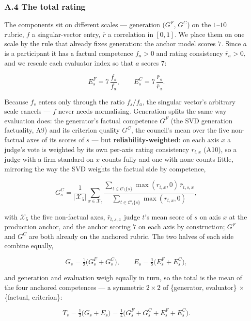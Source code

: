 \subsubsection{A.4 The total rating}\label{a.4-the-total-rating}

The components sit on different scales --- generation (\(G^{F}\), \(G^{C}\)) on the \(1\)--\(10\) rubric, \(f\) a singular-vector entry, \(\bar r\) a correlation in \([0,1]\). We place them on one scale by the rule that already fixes generation: the anchor model scores \(7\). Since \(a\) is a participant it has a factual competence \(f_a>0\) and rating consistency \(\bar r_a>0\), and we rescale each evaluator index so that \(a\) scores \(7\):

\[ E^{F}_s=7\,\frac{f_s}{f_a},\qquad E^{C}_s=7\,\frac{\bar r_s}{\bar r_a}. \tag{A12}\]

Because \(f_s\) enters only through the ratio \(f_s/f_a\), the singular vector's arbitrary scale cancels --- \(f\) never needs normalising. Generation splits the same way evaluation does: the generator's factual competence \(G^{F}\) (the SVD generation factuality, A9) and its criterion quality \(G^{C}\), the council's mean over the five non-factual axes of its scores of \(s\) --- but \textbf{reliability-weighted}: on each axis \(x\) a judge's vote is weighted by its own per-axis rating consistency \(r_{t,x}\) (A10), so a judge with a firm standard on \(x\) counts fully and one with none counts little, mirroring the way the SVD weights the factual side by competence,

\[ G^{C}_s=\frac{1}{|\mathcal{X}_{5}|}\sum_{x\in\mathcal{X}_{5}}\frac{\sum_{t\in\mathcal{C}\setminus\{s\}}\max(r_{t,x},0)\,\bar r_{t,s,x}}{\sum_{t\in\mathcal{C}\setminus\{s\}}\max(r_{t,x},0)}, \tag{A12b}\]

with \(\mathcal{X}_{5}\) the five non-factual axes, \(\bar r_{t,s,x}\) judge \(t\)'s mean score of \(s\) on axis \(x\) at the production anchor, and the anchor scoring \(7\) on each axis by construction; \(G^{F}\) and \(G^{C}\) are both already on the anchored rubric. The two halves of each side combine equally,

\[ G_s=\tfrac12\big(G^{F}_s+G^{C}_s\big),\qquad E_s=\tfrac12\big(E^{F}_s+E^{C}_s\big), \tag{A13}\]

and generation and evaluation weigh equally in turn, so the total is the mean of the four anchored competences --- a symmetric \(2\times2\) of \{generator, evaluator\} \(\times\) \{factual, criterion\}:

\[ T_s=\tfrac12\big(G_s+E_s\big)=\tfrac14\big(G^{F}_s+G^{C}_s+E^{F}_s+E^{C}_s\big). \tag{A14}\]

